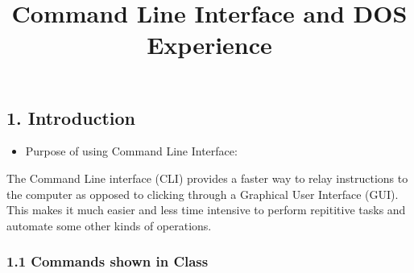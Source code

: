 \documentclass[
  12pt,
]{article}
\title{Command Line Interface and DOS Experience}
\author{}
\date{}
\providecommand{\tightlist}{%
  \setlength{\itemsep}{0pt}\setlength{\parskip}{0pt}}
\begin{document}
\maketitle

{
\setcounter{tocdepth}{3}
\tableofcontents
}
\vspace{2.5em}

\noindent{}

\pagebreak

\subsection{1. Introduction}\label{introduction}

\begin{itemize}
\tightlist
\item
  Purpose of using Command Line Interface:
\end{itemize}

The Command Line interface (CLI) provides a faster way to relay
instructions to the computer as opposed to clicking through a Graphical
User Interface (GUI). This makes it much easier and less time intensive
to perform repititive tasks and automate some other kinds of operations.

\subsubsection{1.1 Commands shown in
Class}\label{commands-shown-in-class}
\end{document}
